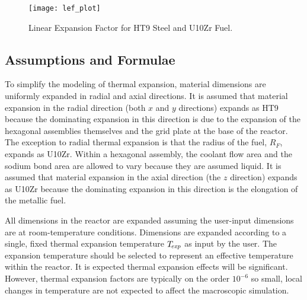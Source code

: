     \begin{figure}
      \centering
      \texttt{[image: lef\_plot]}
      \caption{Linear Expansion Factor for HT9 Steel and U10Zr Fuel.}
      \label{fig:lef_plot}
    \end{figure}
    
  \subsection{Assumptions and Formulae}
  \label{sec:model_details__assumptions_and_formulae}
    To simplify the modeling of thermal expansion, material dimensions are
    uniformly expanded in radial and axial directions. It is assumed that 
    material expansion in the radial direction (both $x$ and $y$ directions) 
    expands as HT9 because the dominating expansion in this direction is due to 
    the expansion of the hexagonal assemblies themselves and the grid plate at
    the base of the reactor. The exception to radial thermal expansion is that 
    the radius of the fuel, $R_F$, expands as U10Zr.  Within a hexagonal 
    assembly, the coolant flow area and the sodium bond area are allowed to 
    vary because they are assumed liquid.  It is assumed that material 
    expansion in the axial direction (the $z$ direction) expands as U10Zr 
    because the dominating expansion in this direction is the elongation of the 
    metallic fuel. 
    
    All dimensions in the reactor are expanded assuming the user-input 
    dimensions are at room-temperature conditions. Dimensions are expanded
    according to a single, fixed thermal expansion temperature $T_{\!\mbox{\scriptsize \em exp}}$ as input
    by the user. The expansion temperature should be selected to represent an 
    effective temperature within the reactor. It is expected thermal expansion 
    effects will be significant. However, thermal expansion factors are 
    typically on the order $10^{-6}$ so small, local changes in temperature are 
    not expected to affect the macroscopic simulation.

